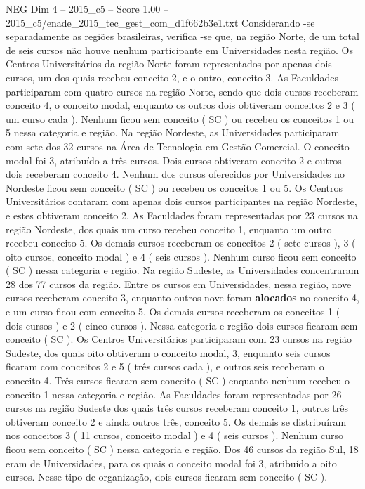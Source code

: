 \begin{textsample}{NEG Dim 4 – 2015\_c5 – Score 1.00 – 2015\_c5/enade\_2015\_tec\_gest\_com\_d1f662b3e1.txt}
Considerando -se separadamente as regiões brasileiras, verifica -se que, na região Norte, de um total de seis cursos não houve nenhum participante em Universidades nesta região.
Os Centros Universitários da região Norte foram representados por apenas dois cursos, um dos quais recebeu conceito 2, e o outro, conceito 3.
As Faculdades participaram com quatro cursos na região Norte, sendo que dois cursos receberam conceito 4, o conceito modal, enquanto os outros dois obtiveram conceitos 2 e 3 ( um curso cada ).
Nenhum ficou sem conceito ( SC ) ou recebeu os conceitos 1 ou 5 nessa categoria e região.
Na região Nordeste, as Universidades participaram com sete dos 32 cursos na Área de Tecnologia em Gestão Comercial.
O conceito modal foi 3, atribuído a três cursos.
Dois cursos obtiveram conceito 2 e outros dois receberam conceito 4.
Nenhum dos cursos oferecidos por Universidades no Nordeste ficou sem conceito ( SC ) ou recebeu os conceitos 1 ou 5.
Os Centros Universitários contaram com apenas dois cursos participantes na região Nordeste, e estes obtiveram conceito 2.
As Faculdades foram representadas por 23 cursos na região Nordeste, dos quais um curso recebeu conceito 1, enquanto um outro recebeu conceito 5.
Os demais cursos receberam os conceitos 2 ( sete cursos ), 3 ( oito cursos, conceito modal ) e 4 ( seis cursos ).
Nenhum curso ficou sem conceito ( SC ) nessa categoria e região.
Na região Sudeste, as Universidades concentraram 28 dos 77 cursos da região.
Entre os cursos em Universidades, nessa região, nove cursos receberam conceito 3, enquanto outros nove foram \textbf{alocados} no conceito 4, e um curso ficou com conceito 5.
Os demais cursos receberam os conceitos 1 ( dois cursos ) e 2 ( cinco cursos ).
Nessa categoria e região dois cursos ficaram sem conceito ( SC ).
Os Centros Universitários participaram com 23 cursos na região Sudeste, dos quais oito obtiveram o conceito modal, 3, enquanto seis cursos ficaram com conceitos 2 e 5 ( três cursos cada ), e outros seis receberam o conceito 4.
Três cursos ficaram sem conceito ( SC ) enquanto nenhum recebeu o conceito 1 nessa categoria e região.
As Faculdades foram representadas por 26 cursos na região Sudeste dos quais três cursos receberam conceito 1, outros três obtiveram conceito 2 e ainda outros três, conceito 5.
Os demais se distribuíram nos conceitos 3 ( 11 cursos, conceito modal ) e 4 ( seis cursos ).
Nenhum curso ficou sem conceito ( SC ) nessa categoria e região.
Dos 46 cursos da região Sul, 18 eram de Universidades, para os quais o conceito modal foi 3, atribuído a oito cursos.
Nesse tipo de organização, dois cursos ficaram sem conceito ( SC ).

\end{textsample}
